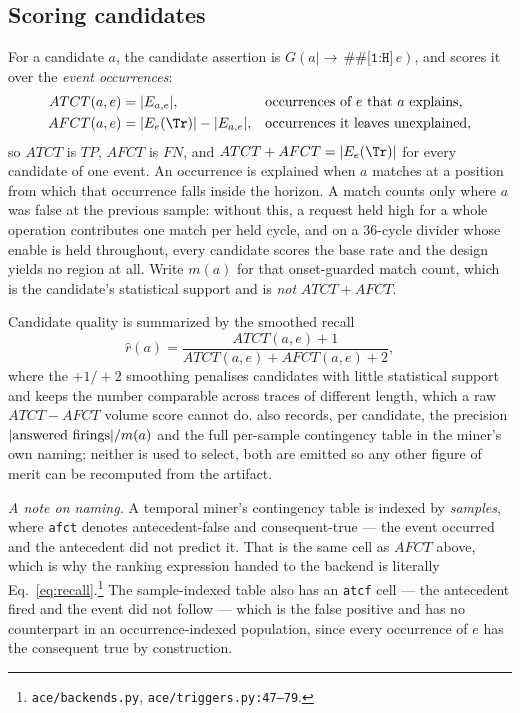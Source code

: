 \subsection{Scoring candidates}
\label{sec:mining}
For a candidate $a$, the candidate assertion is $G(a\mid\to\,\texttt{\#\#[1:H]}\,e)$, and
\ACE{} scores it over the \emph{event occurrences}:
\begin{align}
ATCT(a,e) &= |E_{a,e}|,  &&\text{occurrences of } e \text{ that } a \text{ explains},\\
AFCT(a,e) &= |E_e(\Tr)| - |E_{a,e}|, &&\text{occurrences it leaves unexplained},
\end{align}
so $ATCT$ is $TP$, $AFCT$ is $FN$, and $ATCT+AFCT=|E_e(\Tr)|$ for every candidate of one
event. An occurrence is explained when $a$ matches at a position from which that occurrence
falls inside the horizon. A match counts only where $a$ was false at the previous sample:
without this, a request held high for a whole operation contributes one match per held cycle,
and on a 36-cycle divider whose enable is held throughout, every candidate scores the base
rate and the design yields no region at all. Write $m(a)$ for that onset-guarded match count,
which is the candidate's statistical support and is \emph{not} $ATCT+AFCT$.

Candidate quality is summarized by the smoothed recall
\begin{equation}
\hat{r}(a)=\frac{ATCT(a,e)+1}{ATCT(a,e)+AFCT(a,e)+2},
\label{eq:recall}
\end{equation}
where the $+1/+2$ smoothing penalises candidates with little statistical support and keeps
the number comparable across traces of different length, which a raw $ATCT-AFCT$ volume score
cannot do. \ACE{} also records, per candidate, the precision $|{\rm answered\ firings}|/m(a)$
and the full per-sample contingency table in the miner's own naming; neither is used to
select, both are emitted so any other figure of merit can be recomputed from the artifact.

\emph{A note on naming.} A temporal miner's contingency table is indexed by \emph{samples},
where \texttt{afct} denotes antecedent-false and consequent-true --- the event occurred and
the antecedent did not predict it. That is the same cell as $AFCT$ above, which is why the
ranking expression handed to the backend is literally
Eq.~\ref{eq:recall}.\footnote{\texttt{ace/backends.py}, \texttt{ace/triggers.py:47--79}.} The
sample-indexed table also has an \texttt{atcf} cell --- the antecedent fired and the event did
not follow --- which is the false positive and has no counterpart in an occurrence-indexed
population, since every occurrence of $e$ has the consequent true by construction.

